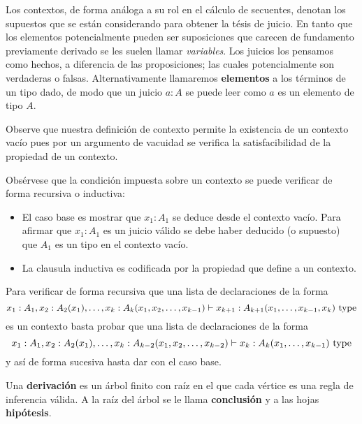 \documentclass{article}
\begin{document}
        Los contextos, de forma análoga a su rol en el cálculo de secuentes, denotan los supuestos que se están considerando para obtener la tésis de juicio.
        En tanto que los elementos potencialmente pueden ser suposiciones que carecen de fundamento previamente derivado se les suelen llamar \textit{variables}.
        Los juicios los pensamos como hechos, a diferencia de las proposiciones; las cuales potencialmente son verdaderas o falsas.
        Alternativamente llamaremos \textbf{elementos} a los términos de un tipo dado, de modo que un juicio $a : A$ se puede leer como $a$ es un elemento de tipo $A$.
        \begin{remark}
            Observe que nuestra definición de contexto permite la existencia de un contexto vacío pues por un argumento de vacuidad se verifica la
            satisfacibilidad de la propiedad de un contexto.
        \end{remark}
        \begin{remark}
            Obsérvese que la condición impuesta sobre un contexto se puede verificar de forma recursiva o inductiva:
            \begin{itemize}
                \item El caso base es mostrar que $x_1 : A_1$ se deduce desde el contexto vacío. Para afirmar que $x_1 : A_1$ es un juicio válido se debe haber deducido (o supuesto)
                que $A_1$ es un tipo en el contexto vacío.
                \item La clausula inductiva es codificada por la propiedad que define a un contexto.
            \end{itemize}

            Para verificar de forma recursiva que una lista de declaraciones de la forma 
            $$
                x_1 : A_1, x_2 : A_2(x_1), \dots, x_k : A_k(x_1, x_2, \dots, x_{k-1}) \vdash x_{k+1} : A_{k+1}(x_1, \dots, x_{k-1}, x_k)\ \mathrm{type}
            $$
            es un contexto basta probar que una lista de declaraciones de la forma
            $$
            x_1 : A_1, x_2 : A_2(x_1), \dots, x_k : A_{k-2}(x_1, x_2, \dots, x_{k-2}) \vdash x_{k} : A_{k}(x_1, \dots, x_{k-1})\ \mathrm{type}
            $$
            y así de forma sucesiva hasta dar con el caso base.
        \end{remark}

        \begin{definition}[Derivación]
            Una \textbf{derivación} es un árbol finito con raíz en el que cada vértice es una regla de inferencia válida.
            A la raíz del árbol se le llama \textbf{conclusión} y a las hojas \textbf{hipótesis}.
        \end{definition}
\end{document}

